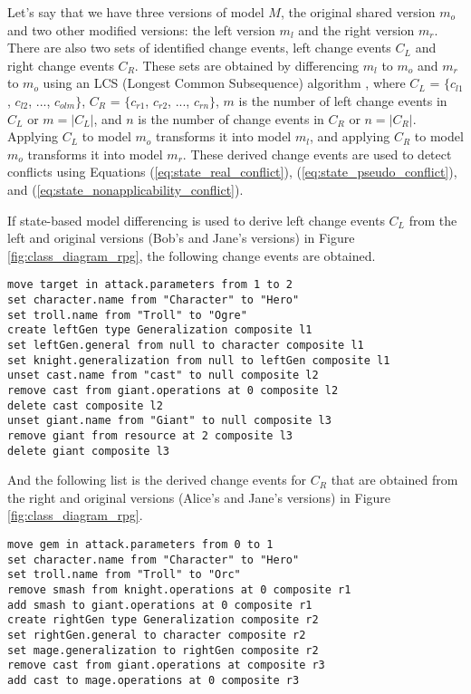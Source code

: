 Let’s say that we have three versions of model $M$, the original shared version $m_{o}$ and two other modified versions: the left version $m_{l}$ and the right version $m_{r}$. There are also two sets of identified change events, left change events $C_{L}$ and right change events $C_{R}$. These sets are obtained by differencing $m_{l}$ to $m_{o}$ and $m_{r}$ to $m_{o}$ using an LCS (Longest Common Subsequence) algorithm \cite{emfcompare2018developer,DBLP:journals/algorithmica/Meyers86}, where $C_{L}$ = $\{c_{l1}$, $c_{l2}$, ..., $c_{olm}\}$, $C_{R}$ = $\{c_{r1}$, $c_{r2}$, ..., $c_{rn}\}$, $m$ is the number of left change events in $C_{L}$ or $m = |C_{L}|$, and $n$ is the number of change events in $C_{R}$ or $n = |C_{R}|$. Applying $C_{L}$ to model $m_{o}$ transforms it into model $m_{l}$, and applying $C_{R}$ to model $m_{o}$ transforms it into model $m_{r}$. These derived change events are used to detect conflicts using Equations (\ref{eq:state_real_conflict}), (\ref{eq:state_pseudo_conflict}), and (\ref{eq:state_nonapplicability_conflict}).

If state-based model differencing is used to derive left change events $C_{L}$ from the left and original versions (Bob’s and Jane’s versions) in Figure \ref{fig:class_diagram_rpg}, the following change events are obtained.
\begin{lstlisting}[firstnumber=1,style=eol,caption={The derived, minimal change events to produce the left version (Bob’s version) in Figure \ref{fig:class_diagram_left} from the original version (Jane’s version).},label=lst:cbp_left_state]
move target in attack.parameters from 1 to 2
set character.name from "Character" to "Hero"
set troll.name from "Troll" to "Ogre"
create leftGen type Generalization composite l1
set leftGen.general from null to character composite l1
set knight.generalization from null to leftGen composite l1
unset cast.name from "cast" to null composite l2
remove cast from giant.operations at 0 composite l2
delete cast composite l2
unset giant.name from "Giant" to null composite l3
remove giant from resource at 2 composite l3
delete giant composite l3
\end{lstlisting}

And the following list is the derived change events for $C_{R}$ that are obtained from the right and original versions (Alice’s and Jane’s versions) in Figure \ref{fig:class_diagram_rpg}.
\begin{lstlisting}[firstnumber=1,style=eol,caption={The derived, minimal change events to produce the right version (Alice’s version) in Figure \ref{fig:class_diagram_right} from the original version (Jane’s version).},label=lst:cbp_right_state]
move gem in attack.parameters from 0 to 1
set character.name from "Character" to "Hero"
set troll.name from "Troll" to "Orc"
remove smash from knight.operations at 0 composite r1
add smash to giant.operations at 0 composite r1
create rightGen type Generalization composite r2
set rightGen.general to character composite r2
set mage.generalization to rightGen composite r2
remove cast from giant.operations at composite r3
add cast to mage.operations at 0 composite r3
\end{lstlisting}

